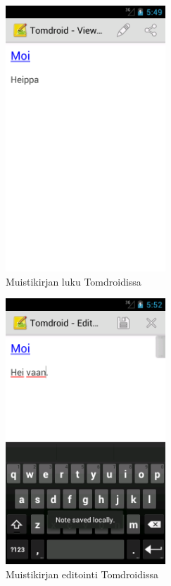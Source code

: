 \begin{figure}[htb]
\includegraphics[width=60mm]{tomdroid_noteview.png}
\caption{Muistikirjan luku Tomdroidissa} \label{tomdroid_noteview}
\end{figure}

\begin{figure}[htb]
\includegraphics[width=60mm]{tomdroid_editview.png}
\caption{Muistikirjan editointi Tomdroidissa} \label{tomdroid_editview}
\end{figure}